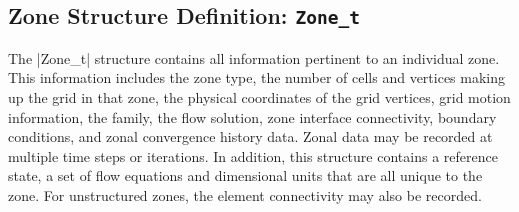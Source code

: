 \subsection{Zone Structure Definition: \texttt{Zone\_t}} 
\label{s:Zone}

The |Zone_t| structure contains all information pertinent to an individual
zone.
This information includes the zone type, the number of cells and
vertices making up the grid in that zone, the physical coordinates
of the grid vertices, grid motion information, the family, the flow
solution, zone interface connectivity, boundary conditions, and zonal
convergence history data.
Zonal data may be recorded at multiple time steps or iterations.
In addition, this structure contains a reference state, a set of flow
equations and dimensional units that are all unique to the zone.
For unstructured zones, the element connectivity may also be recorded.

